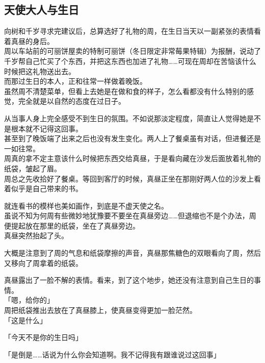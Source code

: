\subsection{天使大人与生日}

向树和千岁寻求完建议后，总算选好了礼物的周，在生日当天以一副紧张的表情看着真昼的身后。\\

周以车站前的可丽饼屋卖的特制可丽饼（冬日限定非常莓果特辑）为报酬，说动了千岁帮自己忙买了个东西，并把这东西也加进了礼物……可现在周却在苦恼该什么时候把这礼物送出去。\\

而那过生日的本人，正和往常一样做着晚饭。\\

虽然周不清楚菜单，但看上去她是在做和食的样子，怎么看都没有什么特别的感觉，完全就是以自然的态度在过日子。

从当事人身上完全感受不到生日的氛围。不如说那淡定程度，简直让人觉得她是不是根本就不记得这回事。\\

甚至到了晚饭端了出来之后也没有发生变化。两人上了餐桌虽有对话，但进餐还是一如往常。\\

周真的拿不定主意该什么时候把东西交给真昼，于是看向藏在沙发后面放着礼物的纸袋，皱起了眉。\\

周总之先收拾好了餐桌。等回到客厅的时候，真昼正坐在那刚好两人位的沙发上看着似乎是自己带来的书。

就连看书的模样也美如画作，到底是不虚天使之名。\\

虽说不知为何周有些微妙地犹豫要不要坐在真昼旁边……但退缩也不是个办法，周便提起放在那里的纸袋，坐在了真昼旁边。\\

真昼突然抬起了头。

大概是注意到了周的气息和纸袋摩擦的声音，真昼那焦糖色的双眼看向了周，然后又移向了周拿着的纸袋。

真昼露出了一脸不解的表情。看来，到了这个地步，她还没有注意到自己生日的事情。\\

「嗯，给你的」\\

周把纸袋推出去放在了真昼膝上，使真昼变得更加一脸茫然。\\

「这是什么」

「今天不是你的生日吗」

「是倒是……话说为什么你会知道啊。我不记得我有跟谁说过这回事」\\

